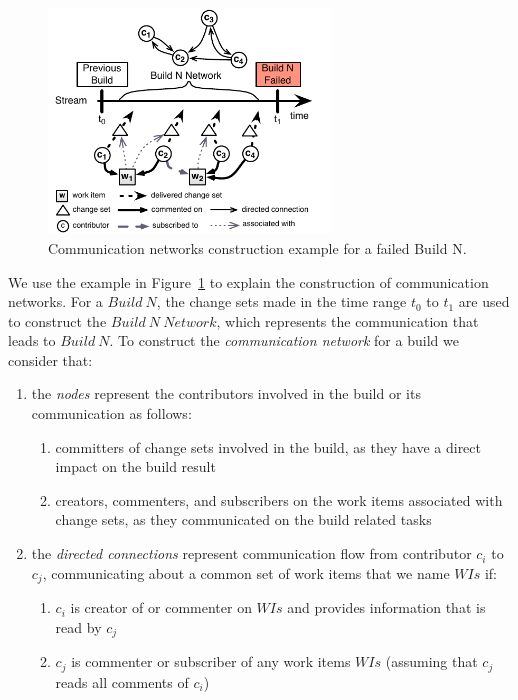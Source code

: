 \begin{figure}[t]
\begin{center}
\includegraphics[width=7.5cm]{figures/BuildResultNetworks3}
\caption{Communication networks construction example for a failed Build N.}
\label{fig:NetworkConstructionExample}
\end{center}
\end{figure}

We use the example in Figure~\ref{fig:NetworkConstructionExample} to explain the
construction of communication networks. For a $Build~N$, the change sets made in
the time range $t_0$ to $t_1$ are used to construct the $Build~N~Network$, which
represents the communication that leads to $Build~N$. To construct the
\emph{communication network} for a build we consider that:

\begin{enumerate}
  \item the \emph{nodes} represent the contributors involved in the build or 
 its communication as follows:
  \begin{enumerate}
    \item committers of change sets involved in the build, as they have a
    direct impact on the build result
    \item creators, commenters, and subscribers on the work items associated with
    change sets, as they communicated on the build related tasks
  \end{enumerate}
  \item the \emph{directed connections} represent communication flow
  from contributor $c_i$ to $c_j$, communicating about a common set of
  work items that we name $WIs$ if:
  \begin{enumerate}
    \item $c_i$ is creator of or commenter on $WIs$ and provides
    information that is read by $c_j$
    \item $c_j$ is commenter or subscriber of any work items $WIs$ (assuming
    that $c_j$ reads all comments of $c_i$)
  \end{enumerate}
\end{enumerate}


